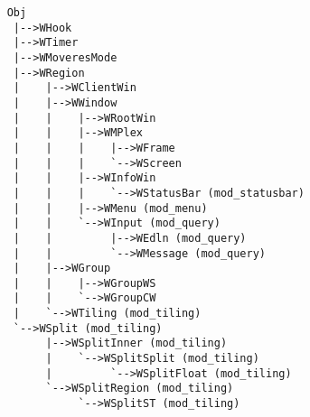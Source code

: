 \label{app:fullhierarchy}
  
{\small
\begin{verbatim}
    Obj
     |-->WHook
     |-->WTimer
     |-->WMoveresMode
     |-->WRegion
     |    |-->WClientWin
     |    |-->WWindow
     |    |    |-->WRootWin
     |    |    |-->WMPlex
     |    |    |    |-->WFrame
     |    |    |    `-->WScreen
     |    |    |-->WInfoWin
     |    |    |    `-->WStatusBar (mod_statusbar)
     |    |    |-->WMenu (mod_menu)
     |    |    `-->WInput (mod_query)
     |    |         |-->WEdln (mod_query)
     |    |         `-->WMessage (mod_query)
     |    |-->WGroup
     |    |    |-->WGroupWS
     |    |    `-->WGroupCW
     |    `-->WTiling (mod_tiling)
     `-->WSplit (mod_tiling)
          |-->WSplitInner (mod_tiling)
          |    `-->WSplitSplit (mod_tiling)
          |         `-->WSplitFloat (mod_tiling)
          `-->WSplitRegion (mod_tiling)
               `-->WSplitST (mod_tiling)
\end{verbatim}
}
